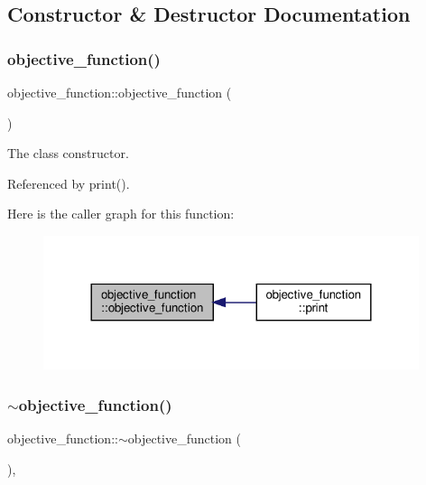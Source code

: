 \subsection{Constructor \& Destructor Documentation}
\mbox{\label{classobjective__function_afaa2f879f6fa344ac73e35d55e6b0e83}} 
\subsubsection{\texorpdfstring{objective\+\_\+function()}{objective\_function()}}
{\footnotesize\ttfamily objective\+\_\+function\+::objective\+\_\+function (\begin{DoxyParamCaption}{ }\end{DoxyParamCaption})\hspace{0.3cm}{\ttfamily [default]}}



The class constructor. 



Referenced by print().

Here is the caller graph for this function\+:
\nopagebreak
\begin{figure}[H]
\begin{center}
\leavevmode
\includegraphics[width=312pt]{d0/da1/classobjective__function_afaa2f879f6fa344ac73e35d55e6b0e83_icgraph}
\end{center}
\end{figure}
\mbox{\label{classobjective__function_afb5e36c983effd86b4f42c2ade3ac73a}} 
\subsubsection{\texorpdfstring{$\sim$objective\+\_\+function()}{~objective\_function()}}
{\footnotesize\ttfamily objective\+\_\+function\+::$\sim$objective\+\_\+function (\begin{DoxyParamCaption}{ }\end{DoxyParamCaption})\hspace{0.3cm}{\ttfamily [virtual]}, {\ttfamily [default]}}



